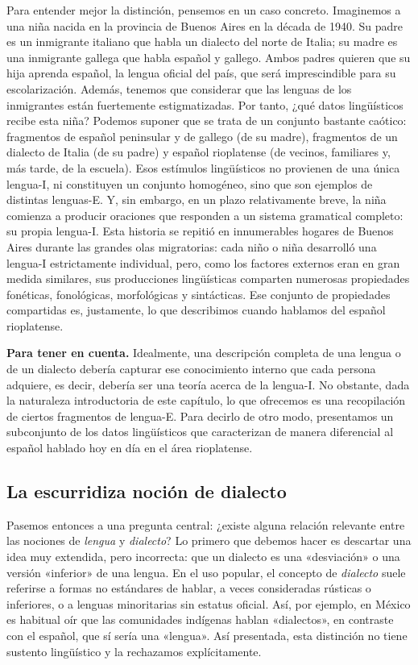 Para entender mejor la distinción, pensemos en un caso concreto. Imaginemos a una
niña nacida en la provincia de Buenos Aires en la década de 1940. Su padre es un
inmigrante italiano que habla un dialecto del norte de Italia; su madre es una
inmigrante gallega que habla español y gallego. Ambos padres quieren que su hija
aprenda español, la lengua oficial del país, que será imprescindible para su
escolarización. Además, tenemos que considerar que las lenguas de los inmigrantes
están fuertemente estigmatizadas. Por tanto, ¿qué datos lingüísticos recibe esta
niña? Podemos suponer que se trata de un conjunto bastante caótico: fragmentos de
español peninsular y de gallego (de su madre), fragmentos de un dialecto de
Italia (de su padre) y español rioplatense (de vecinos, familiares y, más tarde,
de la escuela). Esos estímulos lingüísticos no provienen de una única lengua-I,
ni constituyen un conjunto homogéneo, sino que son ejemplos de distintas
lenguas-E. Y, sin embargo, en un plazo relativamente breve, la niña comienza a
producir oraciones que responden a un sistema gramatical completo: su propia
lengua-I. Esta historia se repitió en innumerables hogares de Buenos Aires
durante las grandes olas migratorias: cada niño o niña desarrolló una lengua-I
estrictamente individual, pero, como los factores externos eran en gran medida
similares, sus producciones lingüísticas comparten numerosas propiedades
fonéticas, fonológicas, morfológicas y sintácticas. Ese conjunto de propiedades
compartidas es, justamente, lo que describimos cuando hablamos del español
rioplatense.

\begin{destacado}
\textbf{Para tener en cuenta.} Idealmente, una descripción completa de una lengua
o de un dialecto debería capturar ese conocimiento interno que cada persona
adquiere, es decir, debería ser una teoría acerca de la lengua-I. No obstante,
dada la naturaleza introductoria de este capítulo, lo que ofrecemos es una
recopilación de ciertos fragmentos de lengua-E. Para decirlo de otro modo,
presentamos un subconjunto de los datos lingüísticos que caracterizan de manera
diferencial al español hablado hoy en día en el área rioplatense.
\end{destacado}

\subsection{La escurridiza noción de dialecto}\label{sec:15-dialecto}

Pasemos entonces a una pregunta central: ¿existe alguna relación relevante entre
las nociones de \textit{lengua} y \textit{dialecto}? Lo primero que debemos hacer
es descartar una idea muy extendida, pero incorrecta: que un dialecto es una
«desviación» o una versión «inferior» de una lengua. En el uso popular, el
concepto de \textit{dialecto} suele referirse a formas no estándares de hablar, a
veces consideradas rústicas o inferiores, o a lenguas minoritarias sin estatus
oficial. Así, por ejemplo, en México es habitual oír que las comunidades
indígenas hablan «dialectos», en contraste con el español, que sí sería una
«lengua». Así presentada, esta distinción no tiene sustento lingüístico y la
rechazamos explícitamente.

